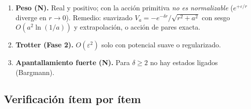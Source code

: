\documentclass[11pt]{article}
\begin{document}
\begin{enumerate}[label=\textbf{L\arabic*.},leftmargin=2.2em]
\item \textbf{Peso (N).} Real y positivo; con la acción primitiva \emph{no es normalizable} ($e^{+\varepsilon/r}$ diverge en $r\to0$). Remedio: suavizado $V_a=-e^{-\delta r}/\sqrt{r^2+a^2}$ con sesgo $O(a^2\ln(1/a))$ y extrapolación, o acción de pares exacta.
\item \textbf{Trotter (Fase 2).} $O(\varepsilon^2)$ solo con potencial suave o regularizado.
\item \textbf{Apantallamiento fuerte (N).} Para $\delta\ge2$ no hay estados ligados (Bargmann).
\end{enumerate}

\subsection{Verificación ítem por ítem}
\end{document}
